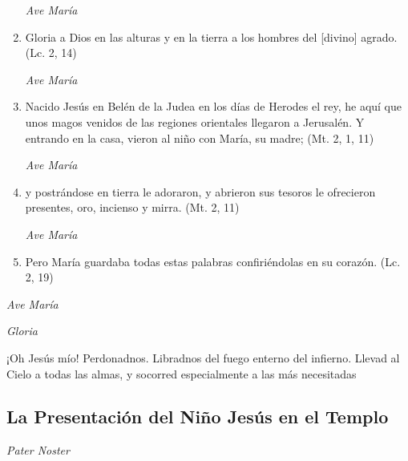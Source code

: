 \documentclass[a4paper,11pt, oneside]{report}
\begin{document}
\begin{enumerate}
          \textit{Ave María}

          \item Gloria a Dios en las alturas y en la tierra a los hombres del [divino] agrado. (Lc. 2, 14)

          \textit{Ave María}

          \item Nacido Jesús en Belén de la Judea en los días de Herodes el rey, he aquí que unos magos venidos de las regiones orientales llegaron a Jerusalén.
          Y entrando en la casa, vieron al niño con María, su madre; (Mt. 2, 1, 11)
          
          \textit{Ave María}

          \item y postrándose en tierra le adoraron, y abrieron sus tesoros le ofrecieron presentes, oro, incienso y mirra. (Mt. 2, 11)
          
          \textit{Ave María}

          \item Pero María guardaba todas estas palabras confiriéndolas en su corazón. (Lc. 2, 19)

        \end{enumerate}

        \textit{Ave María} \par
        \indent\textit{Gloria} \par
        \indent¡Oh Jesús mío! Perdonadnos. Libradnos del fuego enterno del infierno. Llevad al Cielo a todas las almas, y socorred especialmente a las más 
        necesitadas

      \subsection*{La Presentación del Niño Jesús en el Templo}
      
        \textit{Pater Noster}
\end{document}
